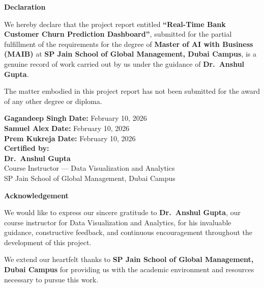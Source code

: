 \documentclass[12pt, a4paper]{report}
\begin{document}
\newpage
\thispagestyle{empty}
\begin{center}
    {\LARGE \textbf{\textcolor{spjblue}{Declaration}}}\\[1cm]
\end{center}

We hereby declare that the project report entitled \textbf{``Real-Time Bank Customer Churn Prediction Dashboard''}, submitted for the partial fulfillment of the requirements for the degree of \textbf{Master of AI with Business (MAIB)} at \textbf{SP Jain School of Global Management, Dubai Campus}, is a genuine record of work carried out by us under the guidance of \textbf{Dr.\ Anshul Gupta}.

\vspace{0.5cm}
The matter embodied in this project report has not been submitted for the award of any other degree or diploma.

\vspace{2cm}
\begin{flushleft}
\textbf{Gagandeep Singh} \hfill \textbf{Date:} February 10, 2026\\[1cm]
\textbf{Samuel Alex} \hfill \textbf{Date:} February 10, 2026\\[1cm]
\textbf{Prem Kukreja} \hfill \textbf{Date:} February 10, 2026\\[2cm]

\textbf{Certified by:}\\[0.5cm]
\textbf{Dr.\ Anshul Gupta}\\
Course Instructor --- Data Visualization and Analytics\\
SP Jain School of Global Management, Dubai Campus
\end{flushleft}

\newpage
\thispagestyle{empty}
\begin{center}
    {\LARGE \textbf{\textcolor{spjblue}{Acknowledgement}}}\\[1cm]
\end{center}

We would like to express our sincere gratitude to \textbf{Dr.\ Anshul Gupta}, our course instructor for Data Visualization and Analytics, for his invaluable guidance, constructive feedback, and continuous encouragement throughout the development of this project.

We extend our heartfelt thanks to \textbf{SP Jain School of Global Management, Dubai Campus} for providing us with the academic environment and resources necessary to pursue this work.
\end{document}
